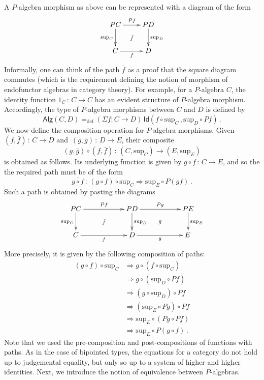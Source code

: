 \documentclass[10pt,a4paper,oneside,reqno]{amsart}
\numberwithin{equation}{section}
\theoremstyle{mythm}
\theoremstyle{mydef}
\theoremstyle{myrmk}
\newcommand{\defeq}{=_{\mathrm{def}}}
\newcommand{\co}{\,{:}\,}
\newcommand{\Id}{\mathsf{Id}}
\newcommand{\Palg}{\mathsf{Alg}}
\renewcommand{\sup}{\mathrm{sup}}
\begin{document}
A $P$-algebra morphism as above can be represented with a diagram of the form
\[
\xymatrix{
 PC \ar[d]_{\sup_C} \ar[r]^{Pf}  \ar@{}[dr]|{\bar{f}} &  PD \ar[d]^{\sup_D}\\
C \ar[r]_{f}   & D}
\] 
Informally, one can think of the path $\bar{f}$ as a proof that the square diagram commutes (which is the 
requirement defining the notion of morphism of endofunctor algebras in category theory). For example, for a $P$-algebra $C$, 
the identity function $1_C \co C \to C$ has an evident structure of $P$-algebra morphism. Accordingly, the type of $P$-algebra 
morphisms between $C$ and $D$ is defined by
\[
\Palg(C,D)
 \defeq  
(\Sigma f:  C \rightarrow D) \, \Id(f\circ \sup_C \, ,  \sup_D \circ P f )  \, .
\]
We now define the composition operation for $P$-algebra morphisms. Given $(f, \bar{f}) \co C \to D$ and~$(g, \bar{g}) \co D \to E$,
their composite 
\[
(g, \bar{g}) \circ (f, \bar{f}) \co (C, \sup_C) \to (E, \sup_E)
\] 
is obtained as follows. Its underlying function is given by $g\circ f\co C \to E$, and so the 
the required path must be of the form
\[
 \overline{ g \circ f} \co (g\circ f) \circ \sup_C \Rightarrow \sup_E \circ P(gf)\, .
\]
Such a path is obtained by pasting the diagrams 
\[
\xymatrix@C=2cm{
 PC \ar[d]_{\sup_C} \ar[r]^{Pf}  \ar@{}[dr]|{\bar{f}} &  PD \ar[d]^{\sup_D}  \ar[r]^{Pg}  \ar@{}[dr]|{\bar{g}} &  PE \ar[d]^{\sup_E} \\
C \ar[r]_{f}   & D \ar[r]_{g}   & E \,  }
\]
More precisely, it is given by the following composition of paths:
\begin{align*}
(g\circ f) \circ \sup_C &  \Rightarrow g \circ (f \circ \sup_C) \\
 & \Rightarrow g \circ ( \sup_D \circ P f ) \\
 & \Rightarrow (g \circ \sup_D) \circ Pf \\
 & \Rightarrow (\sup_E \circ Pg) \circ Pf \\
 & \Rightarrow \sup_E \circ (Pg \circ Pf) \\
 & \Rightarrow \sup_E \circ P (g\circ f) \, .
 \end{align*}
Note that we used the pre-composition and post-compositions of functions with paths. As in the case of bipointed types, the equations for a category do not hold up to judgemental equality, but only so up to a system of higher and higher identities. Next, we introduce the notion of equivalence between $P$-algebras.

\medskip
\end{document}
